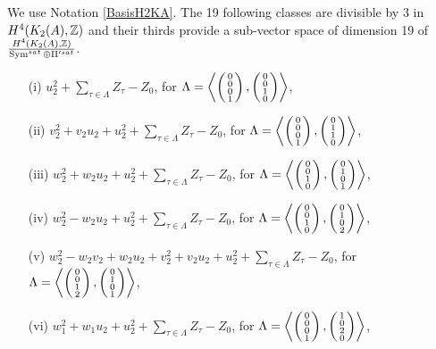 \begin{prop}\label{XIX}
We use Notation \ref{BasisH2KA}.
The 19 following classes are divisible by 3 in $H^{4}(K_2(A),\Z)$ and their thirds provide a sub-vector space of dimension 19 of $\frac{H^4(K_2(A),\Z)}{\Sym^{sat}\oplus\Pi'^{sat}}$.
\begin{itemize}
\item[(i)]
$u_2^2+\sum_{\tau\in \Lambda} Z_\tau-Z_0$, for $\Lambda = \plan{0\\0\\0\\1}{0\\0\\1\\0}$,
\item[(ii)]
$v_2^2+v_2u_2+u_2^2+\sum_{\tau\in \Lambda} Z_\tau-Z_0$, for $\Lambda= \plan{0\\0\\0\\1}{0\\1\\1\\0}$,
\item[(iii)]
$w_2^2+w_2u_2+u_2^2+\sum_{\tau\in \Lambda} Z_\tau-Z_0$, for $\Lambda= \plan{0\\0\\1\\0}{0\\1\\0\\1}$,
\item[(iv)]
$w_2^2-w_2u_2+u_2^2+\sum_{\tau\in \Lambda} Z_\tau-Z_0$, for  $\Lambda= \plan{0\\0\\1\\0}{0\\1\\0\\2}$,
\item[(v)]
$w_2^2-w_2v_2+w_2u_2+v_2^2+v_2u_2+u_2^2+\sum_{\tau\in \Lambda} Z_\tau-Z_0$, for $\Lambda= \plan{0\\0\\1\\2}{0\\1\\0\\1}$,
\item[(vi)]
$w_1^2+w_1u_2+u_2^2+\sum_{\tau\in \Lambda} Z_\tau-Z_0$, for  $\Lambda= \plan{0\\0\\0\\1}{1\\0\\2\\0}$,

\end{itemize}
\end{prop}
